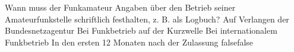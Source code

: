     {Wann muss der Funkamateur Angaben über den Betrieb seiner Amateurfunkstelle schriftlich festhalten, z. B. als Logbuch?}
    {Auf Verlangen der Bundesnetzagentur}
    {Bei Funkbetrieb auf der Kurzwelle}
    {Bei internationalem Funkbetrieb}
    {In den ersten 12 Monaten nach der Zulassung}
    {false}{false}